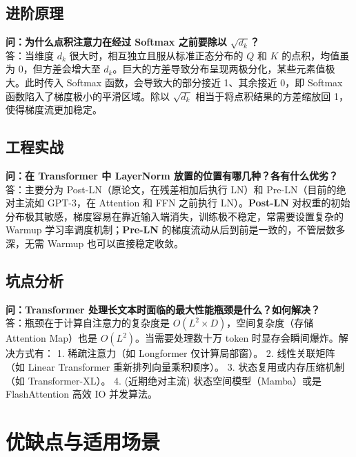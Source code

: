 \documentclass[12pt, a4paper]{book}
\begin{document}
\subsection{进阶原理}
\textbf{问：为什么点积注意力在经过 Softmax 之前要除以 $\sqrt{d_k}$？}\\
答：当维度 $d_k$ 很大时，相互独立且服从标准正态分布的 $Q$ 和 $K$ 的点积，均值虽为 0，但方差会增大至 $d_k$。巨大的方差导致分布呈现两极分化，某些元素值极大。此时传入 Softmax 函数，会导致大的部分接近 1、其余接近 0，即 Softmax 函数陷入了梯度极小的平滑区域。除以 $\sqrt{d_k}$ 相当于将点积结果的方差缩放回 1，使得梯度流更加稳定。

\subsection{工程实战}
\textbf{问：在 Transformer 中 LayerNorm 放置的位置有哪几种？各有什么优劣？}\\
答：主要分为 Post-LN（原论文，在残差相加后执行 LN）和 Pre-LN（目前的绝对主流如 GPT-3，在 Attention 和 FFN 之前执行 LN）。\textbf{Post-LN} 对权重的初始分布极其敏感，梯度容易在靠近输入端消失，训练极不稳定，常需要设置复杂的 Warmup 学习率调度机制；\textbf{Pre-LN} 的梯度流动从后到前是一致的，不管层数多深，无需 Warmup 也可以直接稳定收敛。

\subsection{坑点分析}
\textbf{问：Transformer 处理长文本时面临的最大性能瓶颈是什么？如何解决？}\\
答：瓶颈在于计算自注意力的复杂度是 $O(L^2 \times D)$，空间复杂度（存储 Attention Map）也是 $O(L^2)$。当需要处理数十万 token 时显存会瞬间爆炸。解决方式有：
1. 稀疏注意力（如 Longformer 仅计算局部窗）。
2. 线性关联矩阵（如 Linear Transformer 重新排列向量乘积顺序）。
3. 状态复用或内存压缩机制（如 Transformer-XL）。
4. (近期绝对主流) 状态空间模型（Mamba）或是 FlashAttention 高效 IO 并发算法。

\section{优缺点与适用场景}
\end{document}
